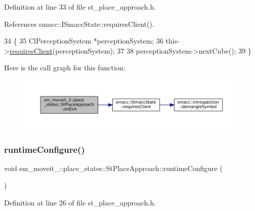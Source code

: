 Definition at line 33 of file st\+\_\+place\+\_\+approach.\+h.



References smacc\+::\+I\+Smacc\+State\+::requires\+Client().


\begin{DoxyCode}
34     \{
35         ClPerceptionSystem *perceptionSystem;
36         this->\hyperlink{classsmacc_1_1ISmaccState_a7f95c9f0a6ea2d6f18d1aec0519de4ac}{requiresClient}(perceptionSystem);
37 
38         perceptionSystem->nextCube();
39     \}
\end{DoxyCode}
Here is the call graph for this function\+:
\nopagebreak
\begin{figure}[H]
\begin{center}
\leavevmode
\includegraphics[width=350pt]{structsm__moveit__2_1_1place__states_1_1StPlaceApproach_acfa22399a60879dfc1597f4c6803fb80_cgraph}
\end{center}
\end{figure}
\mbox{\label{structsm__moveit__2_1_1place__states_1_1StPlaceApproach_aeda5621011fedf4ba6582ea5e60cee3d}} 
\subsubsection{\texorpdfstring{runtime\+Configure()}{runtimeConfigure()}}
{\footnotesize\ttfamily void sm\+\_\+moveit\+\_\+::place\+\_\+states\+::\+St\+Place\+Approach\+::runtime\+Configure (\begin{DoxyParamCaption}{ }\end{DoxyParamCaption})\hspace{0.3cm}{\ttfamily [inline]}}



Definition at line 26 of file st\+\_\+place\+\_\+approach.\+h.



